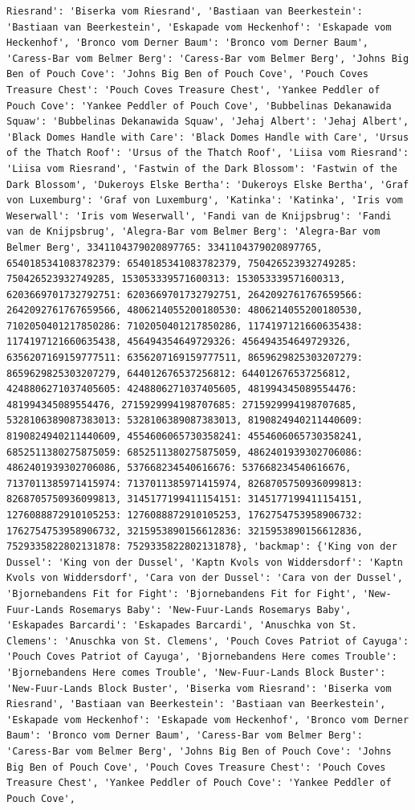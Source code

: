 \documentclass[
  letterpaper,
  DIV=11,
  numbers=noendperiod]{scrreprt}
\begin{document}
\begin{codelisting}
{\begin{verbatim}
Riesrand': 'Biserka vom Riesrand', 'Bastiaan van Beerkestein': 'Bastiaan van Beerkestein', 'Eskapade vom Heckenhof': 'Eskapade vom Heckenhof', 'Bronco vom Derner Baum': 'Bronco vom Derner Baum', 'Caress-Bar vom Belmer Berg': 'Caress-Bar vom Belmer Berg', 'Johns Big Ben of Pouch Cove': 'Johns Big Ben of Pouch Cove', 'Pouch Coves Treasure Chest': 'Pouch Coves Treasure Chest', 'Yankee Peddler of Pouch Cove': 'Yankee Peddler of Pouch Cove', 'Bubbelinas Dekanawida Squaw': 'Bubbelinas Dekanawida Squaw', 'Jehaj Albert': 'Jehaj Albert', 'Black Domes Handle with Care': 'Black Domes Handle with Care', 'Ursus of the Thatch Roof': 'Ursus of the Thatch Roof', 'Liisa vom Riesrand': 'Liisa vom Riesrand', 'Fastwin of the Dark Blossom': 'Fastwin of the Dark Blossom', 'Dukeroys Elske Bertha': 'Dukeroys Elske Bertha', 'Graf von Luxemburg': 'Graf von Luxemburg', 'Katinka': 'Katinka', 'Iris vom Weserwall': 'Iris vom Weserwall', 'Fandi van de Knijpsbrug': 'Fandi van de Knijpsbrug', 'Alegra-Bar vom Belmer Berg': 'Alegra-Bar vom Belmer Berg', 3341104379020897765: 3341104379020897765, 6540185341083782379: 6540185341083782379, 750426523932749285: 750426523932749285, 153053339571600313: 153053339571600313, 6203669701732792751: 6203669701732792751, 2642092761767659566: 2642092761767659566, 4806214055200180530: 4806214055200180530, 7102050401217850286: 7102050401217850286, 1174197121660635438: 1174197121660635438, 456494354649729326: 456494354649729326, 6356207169159777511: 6356207169159777511, 8659629825303207279: 8659629825303207279, 644012676537256812: 644012676537256812, 4248806271037405605: 4248806271037405605, 481994345089554476: 481994345089554476, 2715929994198707685: 2715929994198707685, 5328106389087383013: 5328106389087383013, 8190824940211440609: 8190824940211440609, 4554606065730358241: 4554606065730358241, 6852511380275875059: 6852511380275875059, 4862401939302706086: 4862401939302706086, 537668234540616676: 537668234540616676, 7137011385971415974: 7137011385971415974, 8268705750936099813: 8268705750936099813, 3145177199411154151: 3145177199411154151, 1276088872910105253: 1276088872910105253, 1762754753958906732: 1762754753958906732, 3215953890156612836: 3215953890156612836, 7529335822802131878: 7529335822802131878}, 'backmap': {'King von der Dussel': 'King von der Dussel', 'Kaptn Kvols von Widdersdorf': 'Kaptn Kvols von Widdersdorf', 'Cara von der Dussel': 'Cara von der Dussel', 'Bjornebandens Fit for Fight': 'Bjornebandens Fit for Fight', 'New-Fuur-Lands Rosemarys Baby': 'New-Fuur-Lands Rosemarys Baby', 'Eskapades Barcardi': 'Eskapades Barcardi', 'Anuschka von St. Clemens': 'Anuschka von St. Clemens', 'Pouch Coves Patriot of Cayuga': 'Pouch Coves Patriot of Cayuga', 'Bjornebandens Here comes Trouble': 'Bjornebandens Here comes Trouble', 'New-Fuur-Lands Block Buster': 'New-Fuur-Lands Block Buster', 'Biserka vom Riesrand': 'Biserka vom Riesrand', 'Bastiaan van Beerkestein': 'Bastiaan van Beerkestein', 'Eskapade vom Heckenhof': 'Eskapade vom Heckenhof', 'Bronco vom Derner Baum': 'Bronco vom Derner Baum', 'Caress-Bar vom Belmer Berg': 'Caress-Bar vom Belmer Berg', 'Johns Big Ben of Pouch Cove': 'Johns Big Ben of Pouch Cove', 'Pouch Coves Treasure Chest': 'Pouch Coves Treasure Chest', 'Yankee Peddler of Pouch Cove': 'Yankee Peddler of Pouch Cove', 
\end{verbatim}}
\end{codelisting}
\end{document}
